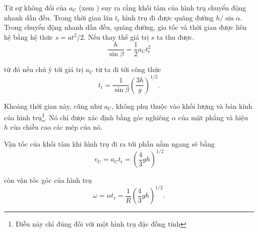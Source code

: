 Từ sự không đổi của $a_{\text{C}}$ (xem ) suy ra rằng khối tâm của hình trụ chuyển động nhanh dần đều. Trong thời gian lăn $t_{\text{r}}$ hình trụ đi được quãng đường $h/\sin\alpha$. Trong chuyển động nhanh dần đều, quãng đường, gia tốc và thời gian được liên hệ bằng hệ thức $s=at^2/2$. Nếu thay thế giá trị $s$ ta thu được.
\begin{equation*}
	\frac{h}{\sin\beta} = \frac{1}{2}a_{\text{C}}t_{\text{r}}^2
\end{equation*}

\noindent
từ đó nếu chú ý tới giá trị $a_{\text{C}}$ từ  ta đi tới công thức
\begin{equation*}
	t_{\text{r}} = \frac{1}{\sin\beta}\left(\frac{3h}{g}\right)^{1/2}.
\end{equation*}

\noindent
Khoảng thời gian này, cũng như $a_{\text{C}}$, không phụ thuộc vào khối lượng và bán kính của hình trụ\footnote{Điều này chỉ đúng đối với một hình trụ đặc đồng tính}. Nó chỉ được xác định bằng góc nghiêng $\alpha$ của mặt phẳng và hiệu $h$ của chiều cao các mép của nó.

Vận tốc của khối tâm khi hình trụ đi ra tới phần nằm ngang sẽ bằng
\begin{equation*}
	v_{\text{C}} = a_{\text{C}}t_{\text{r}} = \left(\frac{4}{3}gh\right)^{1/2}
\end{equation*}

\noindent
còn vận tốc góc của hình trụ
\begin{equation*}
	\omega = \alpha t_{\text{r}} = \frac{1}{R} \left(\frac{4}{3}gh\right)^{1/2}.
\end{equation*}

